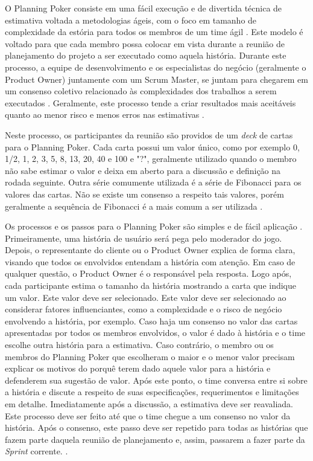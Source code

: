 O Planning Poker consiste em uma fácil execução e de divertida técnica de estimativa voltada a metodologias ágeis, com o foco em tamanho de complexidade da estória para todos os membros de um time ágil \cite{planningpoker,usingfunctionpoints,storyestimation}. Este modelo é voltado para que cada membro possa colocar em vista durante a reunião de planejamento do projeto a ser executado como aquela história\cite{Scrum}. Durante este processo, a equipe de desenvolvimento e os especialistas do negócio (geralmente o Product Owner) juntamente com um Scrum Master, se juntam para chegarem em um consenso coletivo relacionado às complexidades dos trabalhos a serem executados \cite{techplanningpoker}. Geralmente, este processo tende a criar resultados mais aceitáveis quanto ao menor risco e menos erros nas estimativas \cite{usingplanningpoker}.

Neste processo, os participantes da reunião são providos de um \textit{deck} de cartas para o Planning Poker. Cada carta possui um valor único, como por exemplo 0, 1/2, 1, 2, 3, 5, 8, 13, 20, 40 e 100 e "?", geralmente utilizado quando o membro não sabe estimar o valor e deixa em aberto para a discussão e definição na rodada seguinte. Outra série comumente utilizada é a série de Fibonacci para os valores das cartas. Não se existe um consenso a respeito tais valores, porém geralmente a sequência de Fibonacci é a mais comum a ser utilizada \cite{evaluatingplanningpoker}.


Os processos e os passos para o Planning Poker são simples e de fácil aplicação \cite{usingplanningpoker2}. Primeiramente, uma história de usuário será pega pelo moderador do jogo. Depois, o representante do cliente ou o Product Owner explica de forma clara, visando que todos os envolvidos entendam a história com atenção. Em caso de qualquer questão, o Product Owner é o responsável pela resposta. Logo após, cada participante estima o tamanho da história mostrando a carta que indique um valor. Este valor deve ser selecionado. Este valor deve ser selecionado ao considerar fatores influenciantes, como a complexidade e o risco de negócio envolvendo a história, por exemplo. Caso haja um consenso no valor das cartas apresentadas por todos os membros envolvidos, o valor é dado à história e o time escolhe outra história para a estimativa. Caso contrário, o membro ou os membros do Planning Poker que escolheram o maior e o menor valor precisam explicar os motivos do porquê terem dado aquele valor para a história e defenderem sua sugestão de valor. Após este ponto, o time conversa entre si sobre a história e discute a respeito de suas especificações, requerimentos e limitações em detalhe. Imediatamente após a discussão, a estimativa deve ser reavaliada. Este processo deve ser feito até que o time chegue a um consenso no valor da história. Após o consenso, este passo deve ser repetido para todas as histórias que fazem parte daquela reunião de planejamento e, assim, passarem a fazer parte da \textit{Sprint} corrente. \cite{predictingdevelopment}.

